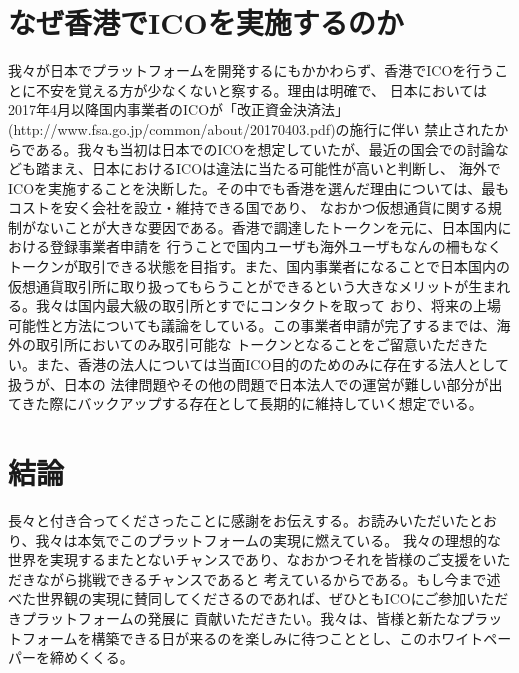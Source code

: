 \documentclass{jsarticle}
\begin{document}
\section{なぜ香港でICOを実施するのか}
我々が日本でプラットフォームを開発するにもかかわらず、香港でICOを行うことに不安を覚える方が少なくないと察する。理由は明確で、
日本においては2017年4月以降国内事業者のICOが「改正資金決済法」(http://www.fsa.go.jp/common/about/20170403.pdf)の施行に伴い
禁止されたからである。我々も当初は日本でのICOを想定していたが、最近の国会での討論なども踏まえ、日本におけるICOは違法に当たる可能性が高いと判断し、
海外でICOを実施することを決断した。その中でも香港を選んだ理由については、最もコストを安く会社を設立・維持できる国であり、
なおかつ仮想通貨に関する規制がないことが大きな要因である。香港で調達したトークンを元に、日本国内における登録事業者申請を
行うことで国内ユーザも海外ユーザもなんの柵もなくトークンが取引できる状態を目指す。また、国内事業者になることで日本国内の
仮想通貨取引所に取り扱ってもらうことができるという大きなメリットが生まれる。我々は国内最大級の取引所とすでにコンタクトを取って
おり、将来の上場可能性と方法についても議論をしている。この事業者申請が完了するまでは、海外の取引所においてのみ取引可能な
トークンとなることをご留意いただきたい。また、香港の法人については当面ICO目的のためのみに存在する法人として扱うが、日本の
法律問題やその他の問題で日本法人での運営が難しい部分が出てきた際にバックアップする存在として長期的に維持していく想定でいる。
\section{結論}
長々と付き合ってくださったことに感謝をお伝えする。お読みいただいたとおり、我々は本気でこのプラットフォームの実現に燃えている。
我々の理想的な世界を実現するまたとないチャンスであり、なおかつそれを皆様のご支援をいただきながら挑戦できるチャンスであると
考えているからである。もし今まで述べた世界観の実現に賛同してくださるのであれば、ぜひともICOにご参加いただきプラットフォームの発展に
貢献いただきたい。我々は、皆様と新たなプラットフォームを構築できる日が来るのを楽しみに待つこととし、このホワイトペーパーを締めくくる。
\end{document}
